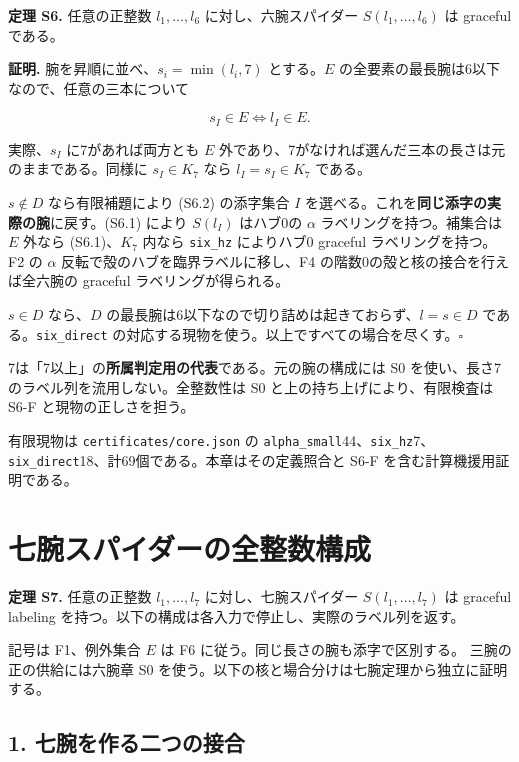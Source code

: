 \documentclass[
  10pt,
  a4paper,
]{article}
\begin{document}
\textbf{定理 S6.} 任意の正整数 \(l_1,\ldots,l_6\) に対し、六腕スパイダー
\(S(l_1,\ldots,l_6)\) は graceful である。

\textbf{証明.} 腕を昇順に並べ、\(s_i=\min(l_i,7)\) とする。\(E\)
の全要素の最長腕は6以下なので、任意の三本について

\[
s_I\in E\iff l_I\in E.
\]

実際、\(s_I\) に7があれば両方とも \(E\)
外であり、7がなければ選んだ三本の長さは元のままである。同様に
\(s_I\in K_7\) なら \(l_I=s_I\in K_7\) である。

\(s\notin D\) なら有限補題により (S6.2) の添字集合 \(I\)
を選べる。これを\textbf{同じ添字の実際の腕}に戻す。(S6.1) により
\(S(l_I)\) はハブ0の \(\alpha\) ラベリングを持つ。補集合は \(E\) 外なら
(S6.1)、\(K_7\) 内なら \texttt{six\_hz} によりハブ0 graceful
ラベリングを持つ。F2 の \(\alpha\) 反転で殻のハブを臨界ラベルに移し、F4
の階数0の殻と核の接合を行えば全六腕の graceful ラベリングが得られる。

\(s\in D\) なら、\(D\)
の最長腕は6以下なので切り詰めは起きておらず、\(l=s\in D\)
である。\texttt{six\_direct}
の対応する現物を使う。以上ですべての場合を尽くす。\(\square\)

7は「7以上」の\textbf{所属判定用の代表}である。元の腕の構成には S0
を使い、長さ7のラベル列を流用しない。全整数性は S0
と上の持ち上げにより、有限検査は S6-F と現物の正しさを担う。

有限現物は \texttt{certificates/core.json} の
\texttt{alpha\_small}44、\texttt{six\_hz}7、\texttt{six\_direct}18、計69個である。本章はその定義照合と
S6-F を含む計算機援用証明である。

\section{七腕スパイダーの全整数構成}\label{ux4e03ux8155ux30b9ux30d1ux30a4ux30c0ux30fcux306eux5168ux6574ux6570ux69cbux6210}

\textbf{定理 S7.} 任意の正整数 \(l_1,\ldots,l_7\) に対し、七腕スパイダー
\(S(l_1,\ldots,l_7)\) は graceful labeling
を持つ。以下の構成は各入力で停止し、実際のラベル列を返す。

記号は F1、例外集合 \(E\) は F6 に従う。同じ長さの腕も添字で区別する。
三腕の正の供給には六腕章 S0
を使う。以下の核と場合分けは七腕定理から独立に証明する。

\subsection{1.
七腕を作る二つの接合}\label{ux4e03ux8155ux3092ux4f5cux308bux4e8cux3064ux306eux63a5ux5408}
\end{document}

